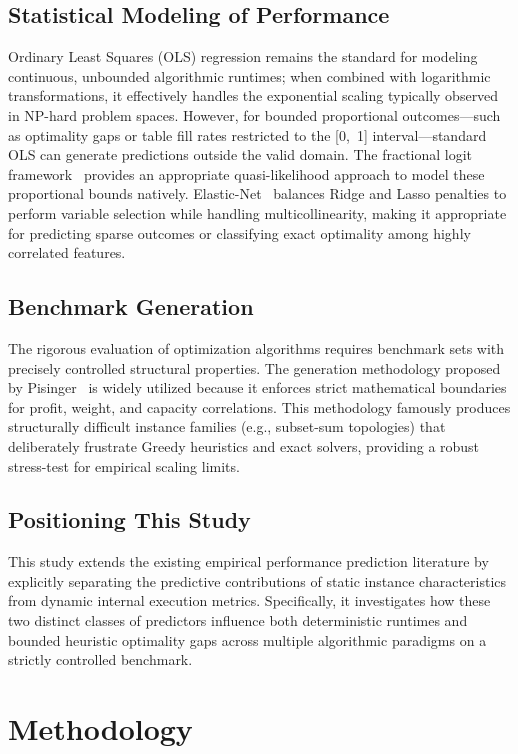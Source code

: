 \documentclass[sigconf]{acmart}
\begin{document}
\subsection{Statistical Modeling of Performance}
Ordinary Least Squares (OLS) regression remains the standard for modeling continuous, unbounded algorithmic runtimes; when combined with logarithmic transformations, it effectively handles the exponential scaling typically observed in NP-hard problem spaces. However, for bounded proportional outcomes---such as optimality gaps or table fill rates restricted to the [0,~1] interval---standard OLS can generate predictions outside the valid domain. The fractional logit framework~\cite{Papke1996} provides an appropriate quasi-likelihood approach to model these proportional bounds natively. Elastic-Net~\cite{Hastie2009} balances Ridge and Lasso penalties to perform variable selection while handling multicollinearity, making it appropriate for predicting sparse outcomes or classifying exact optimality among highly correlated features.

\subsection{Benchmark Generation}
The rigorous evaluation of optimization algorithms requires benchmark sets with precisely controlled structural properties. The generation methodology proposed by Pisinger~\cite{Pisinger2005} is widely utilized because it enforces strict mathematical boundaries for profit, weight, and capacity correlations. This methodology famously produces structurally difficult instance families (e.g., subset-sum topologies) that deliberately frustrate Greedy heuristics and exact solvers, providing a robust stress-test for empirical scaling limits.

\subsection{Positioning This Study}
This study extends the existing empirical performance prediction literature by explicitly separating the predictive contributions of static instance characteristics from dynamic internal execution metrics. Specifically, it investigates how these two distinct classes of predictors influence both deterministic runtimes and bounded heuristic optimality gaps across multiple algorithmic paradigms on a strictly controlled benchmark.

\section{Methodology}
\end{document}
